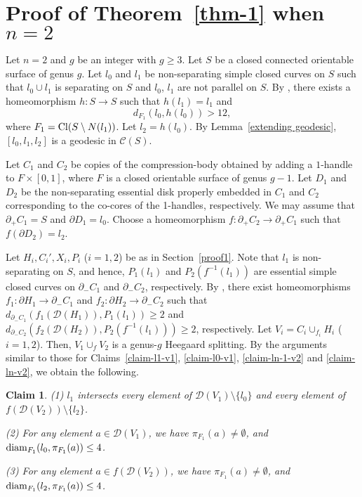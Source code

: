 \documentclass[]{aspm}
\newtheorem{claim}[definition]{Claim}
\begin{document}
\section{Proof of Theorem~\ref{thm-1} when $n=2$}\label{proof2}

Let $n=2$ and $g$ be an integer with $g\geq 3$.
Let $S$ be a closed connected orientable surface of genus $g$.
Let $l_0$ and $l_1$ be non-separating simple closed curves on $S$ such that $l_0\cup l_1$ is separating on $S$ and $l_{0}$, $l_{1}$ are not parallel on $S$. 
By \cite[Proposition 4.6]{MM1}, there exists a homeomorphism $h:S\rightarrow S$ such that $h(l_1)=l_1$ and 
$$d_{F_1}(l_0, h(l_0))>12,$$ 
where $F_1={\rm Cl}(S\setminus N(l_1))$. 
Let $l_2=h(l_0)$.
By Lemma~\ref{extending geodesic}, $[l_0,l_1,l_2]$ is a geodesic in $\mathcal{C}(S)$.

Let $C_1$ and $C_2$ be copies of the compression-body obtained by adding a $1$-handle to $F\times [0,1]$, where $F$ is a closed orientable surface of genus $g-1$.
Let $D_1$ and $D_2$ be the non-separating essential disk properly embedded in $C_1$ and $C_2$ corresponding to the co-cores of the 1-handles, respectively.
We may assume that $\partial_+C_1=S$ and $\partial D_1=l_0$.
Choose a homeomorphism $f:\partial_+C_2\rightarrow \partial_+C_1$ such that $f(\partial D_2)=l_2$.

Let $H_i, C_i', X_i, P_i$ ($i=1,2$) be as in Section~\ref{proof1}.
Note that $l_1$ is non-separating on $S$, and hence, $P_1(l_1)$ and $P_2(f^{-1}(l_1))$ are essential simple closed curves on $\partial_- C_1$ and $\partial_- C_2$, respectively.
By \cite{AS}, there exist homeomorphisms $f_1:\partial H_1\rightarrow \partial_- C_1$ and $f_2:\partial H_2\rightarrow \partial_- C_2$ such that $d_{\partial_- C_1} (f_1(\mathcal{D}(H_1)), P_1(l_1))\geq 2$ and $d_{\partial_- C_2} (f_2(\mathcal{D}(H_2)), P_2(f^{-1}(l_1)))\geq 2$, respectively.
Let $V_i=C_i\cup_{f_i} H_i$ ($i=1,2$).
Then, $V_1\cup_f V_2$ is a genus-$g$ Heegaard splitting.
By the arguments similar to those for Claims~\ref{claim-l1-v1}, \ref{claim-l0-v1}, \ref{claim-ln-1-v2} and \ref{claim-ln-v2}, we obtain the following. 

\begin{claim}\label{claim-n2}
{\rm (1)} $l_1$ intersects every element of $\mathcal{D}(V_1)\setminus \{l_0\}$ and every element of $f(\mathcal{D}(V_2))\setminus \{l_2\}$.

{\rm (2)} For any element $a\in\mathcal{D}(V_1)$, we have $\pi_{F_1}(a)\neq \emptyset$, and ${\rm diam}_{F_1}(l_0, \pi_{F_1}(a))\leq 4$.

{\rm (3)} For any element $a\in f(\mathcal{D}(V_2))$, we have $\pi_{F_{1}}(a)\neq \emptyset$, and ${\rm diam}_{F_1}(l_2, \pi_{F_1}(a))\leq 4$.
\end{claim}
\end{document}
